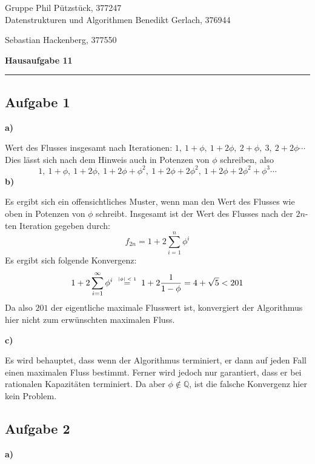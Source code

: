\documentclass[a4paper,graphics,11pt]{article}
\newcommand{\aufgabe}[1]{\subsection*{Aufgabe #1}}
\newcommand{\up}[2]{\mathrel{\overset{\makebox[0pt]{\mbox{\normalfont\tiny #2}}}{#1}}}
\begin{document}
\noindent Gruppe              \hfill Phil Pützstück, 377247\\
\noindent Datenstrukturen und Algorithmen \hfill Benedikt Gerlach, 376944\\
\strut\hfill Sebastian Hackenberg, 377550\\
\begin{center}
	\LARGE{\textbf{Hausaufgabe 11}}
\end{center}
\begin{center}
\rule[0.1ex]{\textwidth}{1pt}
\end{center}

\aufgabe{1}
\textbf{a)}

Wert des Flusses insgesamt nach Iterationen: $1,\ 1+\phi,\ 1+2\phi,\ 2+\phi,\ 3,\ 2+2\phi\cdots$\\
Dies lässt sich nach dem Hinweis auch in Potenzen von $\phi$ schreiben, also
$$
    1,\ 1+\phi,\ 1+2\phi,\ 1+2\phi+\phi^2,\ 1+2\phi+2\phi^2,\ 1+2\phi+2\phi^2+\phi^3\cdots
$$
\textbf{b)}

Es ergibt sich ein offensichtliches Muster, wenn man den Wert des Flusses wie oben in Potenzen von $\phi$ schreibt.
Insgesamt ist der Wert des Flusses nach der $2n$-ten Iteration gegeben durch:
$$
    f_{2n} = 1+2\sum_{i=1}^{n} \phi^i
$$
Es ergibt sich folgende Konvergenz:
$$
    1+2\sum_{i=1}^{\infty} \phi^i
    \quad\up{=}{$|\phi| < 1$}\quad 1+2\frac{1}{1-\phi} = 4 + \sqrt{5} < 201
$$
Da also $201$ der eigentliche maximale Flusswert ist, konvergiert der Algorithmus hier nicht zum erwünschten maximalen
Fluss.

\textbf{c)}

Es wird behauptet, dass wenn der Algorithmus terminiert, er dann auf jeden Fall einen maximalen Fluss bestimmt.
Ferner wird jedoch nur garantiert, dass er bei rationalen Kapazitäten terminiert.
Da aber $\phi \notin \mathbb{Q}$, ist die falsche Konvergenz hier kein Problem.

\aufgabe{2}
\textbf{a)}
\end{document}
